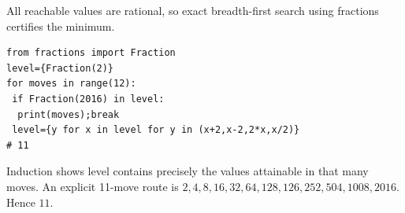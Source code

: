 All reachable values are rational, so exact breadth-first search using fractions certifies the minimum.\begin{verbatim}
from fractions import Fraction
level={Fraction(2)}
for moves in range(12):
 if Fraction(2016) in level:
  print(moves);break
 level={y for x in level for y in (x+2,x-2,2*x,x/2)}
# 11
\end{verbatim}
Induction shows level contains precisely the values attainable in that many moves. An explicit 11-move route is $2,4,8,16,32,64,128,126,252,504,1008,2016$. Hence $\boxed{11}$.
